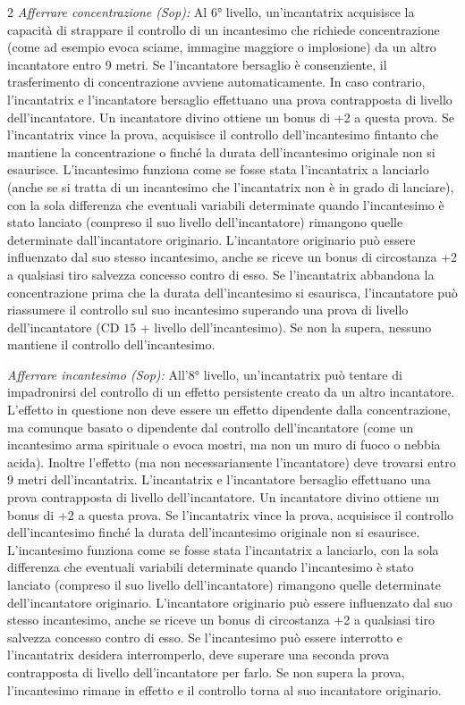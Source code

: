 \documentclass[10pt, a4paper]{report}
\begin{document}
\begin{multicols}{2}
\textit{Afferrare concentrazione (Sop):} Al 6° livello, un'incantatrix acquisisce la capacità di strappare il controllo di un incantesimo che richiede concentrazione (come ad esempio evoca sciame, immagine maggiore o implosione) da un altro incantatore entro 9 metri. Se l'incantatore bersaglio è consenziente, il trasferimento di concentrazione avviene automaticamente. In caso contrario, l'incantatrix e l'incantatore bersaglio effettuano una prova contrapposta di livello dell'incantatore. Un incantatore divino ottiene un bonus di +2 a questa prova. Se l'incantatrix vince la prova, acquisisce il controllo dell'incantesimo fintanto che mantiene la concentrazione o finché la durata dell'incantesimo originale non si esaurisce. L'incantesimo funziona come se fosse stata l'incantatrix a lanciarlo (anche se si tratta di un incantesimo che l'incantatrix non è in grado di lanciare), con la sola differenza che eventuali variabili determinate quando l'incantesimo è stato lanciato (compreso il suo livello dell'incantatore) rimangono quelle determinate dall'incantatore originario. L'incantatore originario può essere influenzato dal suo stesso incantesimo, anche se riceve un bonus di circostanza +2 a qualsiasi tiro salvezza concesso contro di esso. Se l'incantatrix abbandona la concentrazione prima che la durata dell'incantesimo si esaurisca, l'incantatore può riassumere il controllo sul suo incantesimo superando una prova di livello dell'incantatore (CD $15$ + livello dell'incantesimo). Se non la supera, nessuno mantiene il controllo dell'incantesimo.

\textit{Afferrare incantesimo (Sop):} All'8° livello, un'incantatrix può tentare di impadronirsi del controllo di un effetto persistente creato da un altro incantatore. L'effetto in questione non deve essere un effetto dipendente dalla concentrazione, ma comunque basato o dipendente dal controllo dell'incantatore (come un incantesimo arma spirituale o evoca mostri, ma non un muro di fuoco o nebbia acida). Inoltre l'effetto (ma non necessariamente l'incantatore) deve trovarsi entro 9 metri dell'incantatrix. L'incantatrix e l'incantatore bersaglio effettuano una prova contrapposta di livello dell'incantatore. Un incantatore divino ottiene un bonus di +2 a questa prova. Se l'incantatrix vince la prova, acquisisce il controllo dell'incantesimo finché la durata dell'incantesimo originale non si esaurisce. L'incantesimo funziona come se fosse stata l'incantatrix a lanciarlo, con la sola differenza che eventuali variabili determinate quando l'incantesimo è stato lanciato (compreso il suo livello dell'incantatore) rimangono quelle determinate dell'incantatore originario. L'incantatore originario può essere influenzato dal suo stesso incantesimo, anche se riceve un bonus di circostanza +2 a qualsiasi tiro salvezza concesso contro di esso. Se l'incantesimo può essere interrotto e l'incantatrix desidera interromperlo, deve superare una seconda prova contrapposta di livello dell'incantatore per farlo. Se non supera la prova, l'incantesimo rimane in effetto e il controllo torna al suo incantatore originario.\\


\end{multicols}
\end{document}
